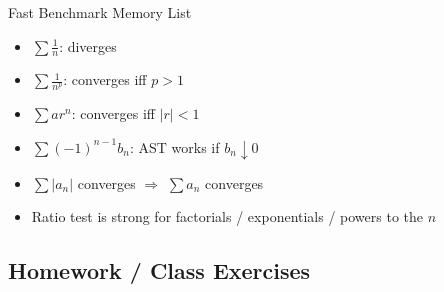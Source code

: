 \documentclass[11pt]{article}
\begin{document}
\begin{summarybox}{Fast Benchmark Memory List}
\begin{itemize}
    \item \(\sum \frac1n\): diverges
    \item \(\sum \frac1{n^p}\): converges iff \(p>1\)
    \item \(\sum ar^n\): converges iff \(|r|<1\)
    \item \(\sum (-1)^{n-1}b_n\): AST works if \(b_n\downarrow 0\)
    \item \(\sum |a_n|\) converges \(\Rightarrow\) \(\sum a_n\) converges
    \item Ratio test is strong for factorials / exponentials / powers to the \(n\)
\end{itemize}
\end{summarybox}


\newpage
\newpage
\subsection{Homework / Class Exercises}
\end{document}
